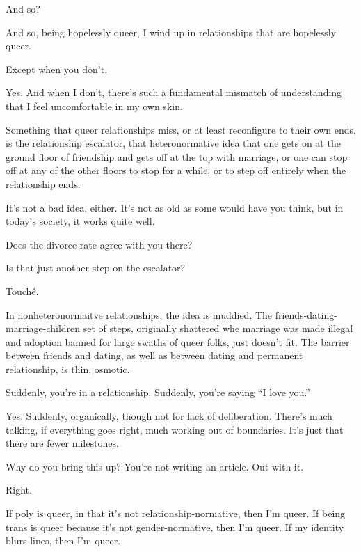 \begin{leftcolumn}
\begin{ally}
And so?
\end{ally}
And so, being hopelessly queer, I wind up in relationships that are hopelessly queer.

\begin{ally}
Except when you don't.
\end{ally}
Yes. And when I don't, there's such a fundamental mismatch of understanding that I feel uncomfortable in my own skin.

Something that queer relationships miss, or at least reconfigure to their own ends, is the relationship escalator, that heteronormative idea that one gets on at the ground floor of friendship and gets off at the top with marriage, or one can stop off at any of the other floors to stop for a while, or to step off entirely when the relationship ends.

It's not a bad idea, either. It's not as old as some would have you think, but in today's society, it works quite well.

\begin{ally}
Does the divorce rate agree with you there?
\end{ally}
Is that just another step on the escalator?

\begin{ally}
Touché.
\end{ally}
In nonheteronormaitve relationships, the idea is muddied. The friends-dating-marriage-children set of steps, originally shattered whe marriage was made illegal and adoption banned for large swaths of queer folks, just doesn't fit. The barrier between friends and dating, as well as between dating and permanent relationship, is thin, osmotic.

\begin{ally}
Suddenly, you're in a relationship. Suddenly, you're saying ``I love you.''
\end{ally}
Yes. Suddenly, organically, though not for lack of deliberation. There's much talking, if everything goes right, much working out of boundaries. It's just that there are fewer milestones.

\begin{ally}
Why do you bring this up? You're not writing an article. Out with it.
\end{ally}
Right.
\newpage

\noindent If poly is queer, in that it's not relationship-normative, then I'm queer. If being trans is queer because it's not gender-normative, then I'm queer. If my identity blurs lines, then I'm queer.


\end{leftcolumn}
